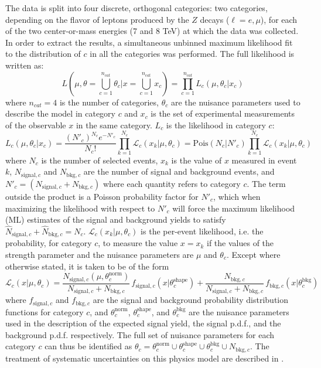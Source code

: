 The data is split into four discrete, orthogonal categories: two categories,
depending on the flavor of leptons produced by the $Z$ decays ($\ell = e, \mu$),
for each of the two center-or-mass energies (7 and 8 TeV) at which the data was
collected. In order to extract the results, a simultaneous unbinned maximum
likelihood fit to the distribution of $c$ in all the categories was performed.
The full likelihood is written as:
\[
    L\left(\mu,\theta=\bigcup_{c=1}^{n_{cat}}\theta_c|x=\bigcup_{c=1}^{n_{cat}} 
    x_c\right) = 
    \prod_{c=1}^{n_{cat}} L_c(\mu,\theta_c|x_c)
\]
where $n_{cat}=4$ is the number of categories, $\theta_c$ are the nuisance
parameters used to describe the model in category $c$ and $x_c$ is the set of
experimental measurements of the observable $x$ in the same category. $L_c$
is the likelihood in category $c$:
\[
    L_c(\mu,\theta_c|x_c) = \frac{({N'}_c)^{N_c} e^{-{N'}_c}}{N_c !} \prod_{k=1}^{N_c}
    \mathcal{L}_c(x_k|\mu,\theta_c) = 
    \text{Pois}(N_c|{N'}_c) \prod_{k=1}^{N_c} \mathcal{L}_c(x_k|\mu,\theta_c) 
\]
where $N_c$ is the number of selected events, $x_k$ is the value of $x$ measured
in event $k$, $N_{\text{signal},c}$ and $N_{\text{bkg},c}$ are the number of
signal and background events, and ${N'}_c = (N_{\text{signal},c} + N_{\text{bkg},c})$
where each quantity refers to category $c$. The term outside the product is a
Poisson probability factor for ${N'}_c$, which when maximizing the likelihood with
respect to ${N'}_c$ will force the maximum likelihood (ML) estimates of the signal
and background yields to satisfy $\hat N_{\text{signal},c} + \hat N_{\text{bkg},c} =
N_c$. $\mathcal{L}_c(x_k|\mu,\theta_c)$ is the per-event likelihood, i.e. the 
probability, for category $c$, to measure the value $x=x_k$ if the values
of the strength parameter and the nuisance parameters are $\mu$ and $\theta_c$.
Except where otherwise stated, it is taken to be of the form
\[
    \mathcal{L}_c(x|\mu,\theta_c) = \frac{N_{\text{signal},c}(\mu,\theta_c^{\text{norm}})}{N_{\text{signal},c} + N_{\text{bkg},c}}\, f_{\text{signal},c}(x|\theta_c^{\text{shape}}) 
    + \frac{N_{\text{bkg},c}}{N_{\text{signal},c} + N_{\text{bkg},c}}\, f_{\text{bkg},c}(x|\theta_c^{\text{bkg}})
\]
where $f_{\text{signal},c}$ and $f_{\text{bkg},c}$ are the signal and background
probability distribution functions for category $c$, and $\theta_c^{\text{norm}}$,
$\theta_c^{\text{shape}}$, and $\theta_c^{\text{bkg}}$ are the nuisance parameters
used in the description of the expected signal yield, the signal p.d.f., and the
background p.d.f. respectively. The full set of nuisance parameters for each category
$c$ can thus be identified as 
$\theta_c = \theta_c^{\text{norm}} \cup \theta_c^{\text{shape}} \cup 
\theta_c^{\text{bkg}} \cup N_{\text{bkg},c}$. The treatment of systematic 
uncertainties on this physics model are described in .


